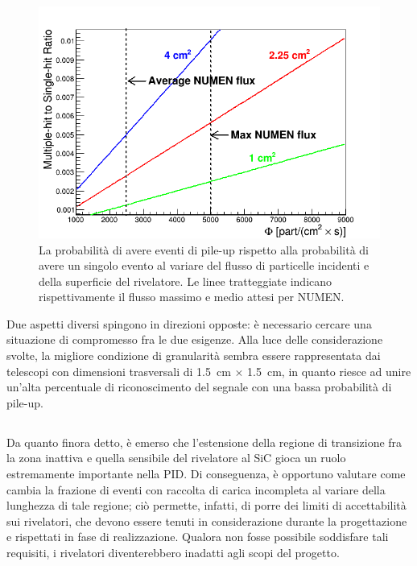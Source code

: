 \begin{figure} [!t]
	\centering
	\includegraphics[scale=0.55]{Grafici_Tesi/Granularita/pile-up3.png}
	\caption{La probabilità di avere eventi di pile-up rispetto alla probabilità di avere un singolo evento al variare del flusso di particelle incidenti e della superficie del rivelatore. Le linee tratteggiate indicano rispettivamente il flusso massimo e medio attesi per NUMEN.} \label{fig:pile-up}
\end{figure}


Due aspetti diversi spingono in direzioni opposte: è necessario cercare una situazione di compromesso fra le due esigenze.
Alla luce delle considerazione svolte, la migliore condizione di granularità sembra essere rappresentata dai telescopi con dimensioni trasversali di 1.5~cm $\times$ 1.5~cm, in quanto riesce ad unire un'alta percentuale di riconoscimento del segnale con una bassa probabilità di pile-up.





\subsection{}

Da quanto finora detto, è emerso che l'estensione della regione di transizione fra la zona inattiva e quella sensibile del rivelatore al SiC gioca un ruolo estremamente importante nella PID.
Di conseguenza, è opportuno valutare come cambia la frazione di eventi con raccolta di carica incompleta al variare della lunghezza di tale regione; 
ciò permette, infatti, di porre dei limiti di accettabilità sui rivelatori, che devono essere tenuti in considerazione durante la progettazione e rispettati in fase di realizzazione.
Qualora non fosse possibile soddisfare tali requisiti, i rivelatori diventerebbero inadatti agli scopi del progetto.


